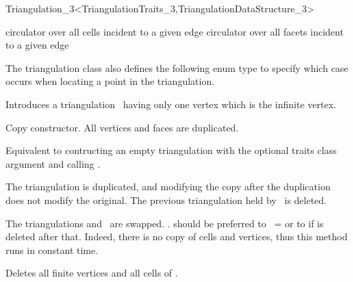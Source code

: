 \begin{ccRefClass}{Triangulation_3<TriangulationTraits_3,TriangulationDataStructure_3>}
\ccThreeToTwo

{circulator over all cells incident to a given edge} 
\ccGlue
{}
{circulator over all facets incident to a given edge}

The triangulation class also defines the following enum type to specify
which case occurs when locating a point in the triangulation. 

{}


\ccCreation
{}  %

\ccThreeToTwo

{Introduces a triangulation \ccVar\ having only one vertex which is the
infinite vertex.} 

{Copy constructor. All vertices and faces are duplicated.}

{Equivalent to contructing an empty triangulation with the optional
traits class argument and calling .}


{The triangulation  is duplicated, and modifying the copy after the 
duplication does not modify the original. The previous triangulation held
by \ccVar\ is deleted.}

{The triangulations  and \ccVar\ are swapped.
\ccVar. should be preferred to \ccVar\ =  or to
 if  is deleted after that. Indeed, there is no
copy of cells and vertices, thus this method runs in constant time.}

{Deletes all finite vertices and all cells of \ccVar.}


\end{ccRefClass}
